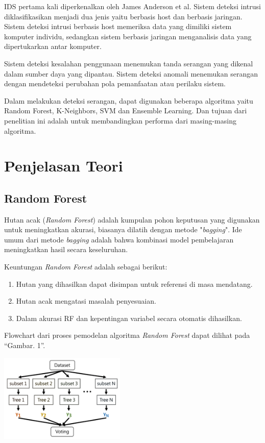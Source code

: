 \documentclass[conference]{IEEEtran}
\begin{document}
IDS pertama kali diperkenalkan oleh James Anderson et al. 
Sistem deteksi intrusi diklasifikasikan menjadi dua jenis yaitu berbasis host dan berbasis jaringan. Sistem deteksi intrusi 
berbasis host memeriksa data yang dimiliki sistem komputer individu, sedangkan sistem berbasis jaringan 
menganalisis data yang dipertukarkan antar komputer\cite{farnaaz2016random}.

Sistem deteksi kesalahan penggunaan menemukan tanda serangan yang dikenal dalam sumber daya yang dipantau. Sistem deteksi anomali menemukan serangan dengan mendeteksi perubahan pola pemanfaatan atau perilaku sistem\cite{hasan}.

Dalam melakukan deteksi serangan, dapat digunakan beberapa algoritma  yaitu Random Forest, K-Neighbors\cite{nurhadi2017aplikasi}, SVM dan Ensemble Learning\cite{zhang}. Dan tujuan dari penelitian ini adalah untuk membandingkan performa dari masing-masing algoritma.

\section{Penjelasan Teori}

\subsection{Random Forest}

Hutan acak (\emph{Random Forest}) adalah kumpulan pohon keputusan yang digunakan untuk meningkatkan akurasi, biasanya dilatih dengan metode "\emph{bagging}". Ide umum dari metode \emph{bagging} adalah bahwa kombinasi model pembelajaran meningkatkan hasil secara keseluruhan.

Keuntungan \emph{Random Forest} adalah sebagai berikut\cite{farnaaz2016random}:

\begin{enumerate}
\item Hutan yang dihasilkan dapat disimpan untuk referensi di masa mendatang.
\item Hutan acak mengatasi masalah penyesuaian.
\item Dalam akurasi RF dan kepentingan variabel secara otomatis dihasilkan.
\end{enumerate}

Flowchart dari proses pemodelan algoritma \emph{Random Forest} dapat dilihat pada ``Gambar. 1''.\vspace{6pt}

\begin{minipage}{\linewidth}
\centerline{\includegraphics[width=60mm]{Gambar/Gbr001.jpg}}
\label{fig1}
\end{minipage}
\end{document}

